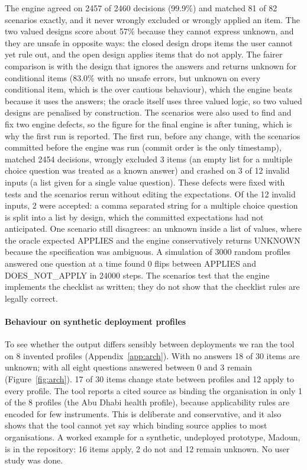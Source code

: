 \documentclass[conference]{IEEEtran}
\begin{document}
The engine agreed on 2457 of 2460 decisions (99.9\%) and matched 81 of 82 scenarios exactly, and it never wrongly excluded or wrongly applied an item. The two valued designs score about 57\% because they cannot express unknown, and they are unsafe in opposite ways: the closed design drops items the user cannot yet rule out, and the open design applies items that do not apply. The fairer comparison is with the design that ignores the answers and returns unknown for conditional items (83.0\% with no unsafe errors, but unknown on every conditional item, which is the over cautious behaviour), which the engine beats because it uses the answers; the oracle itself uses three valued logic, so two valued designs are penalised by construction. The scenarios were also used to find and fix two engine defects, so the figure for the final engine is after tuning, which is why the first run is reported. The first run, before any change, with the scenarios committed before the engine was run (commit order is the only timestamp), matched 2454 decisions, wrongly excluded 3 items (an empty list for a multiple choice question was treated as a known answer) and crashed on 3 of 12 invalid inputs (a list given for a single value question). These defects were fixed with tests and the scenarios rerun without editing the expectations. Of the 12 invalid inputs, 2 were accepted: a comma separated string for a multiple choice question is split into a list by design, which the committed expectations had not anticipated. One scenario still disagrees: an unknown inside a list of values, where the oracle expected APPLIES and the engine conservatively returns UNKNOWN because the specification was ambiguous. A simulation of 3000 random profiles answered one question at a time found 0 flips between APPLIES and DOES\_NOT\_APPLY in 24000 steps. The scenarios test that the engine implements the checklist as written; they do not show that the checklist rules are legally correct.

\paragraph{Behaviour on synthetic deployment profiles} To see whether the output differs sensibly between deployments we ran the tool on 8 invented profiles (Appendix~\ref{app:arch}). With no answers 18 of 30 items are unknown; with all eight questions answered between 0 and 3 remain (Figure~\ref{fig:arch}). 17 of 30 items change state between profiles and 12 apply to every profile. The tool reports a cited source as binding the organisation in only 1 of the 8 profiles (the Abu Dhabi health profile), because applicability rules are encoded for few instruments. This is deliberate and conservative, and it also shows that the tool cannot yet say which binding source applies to most organisations. A worked example for a synthetic, undeployed prototype, Madoun, is in the repository: 16 items apply, 2 do not and 12 remain unknown. No user study was done.
\end{document}
